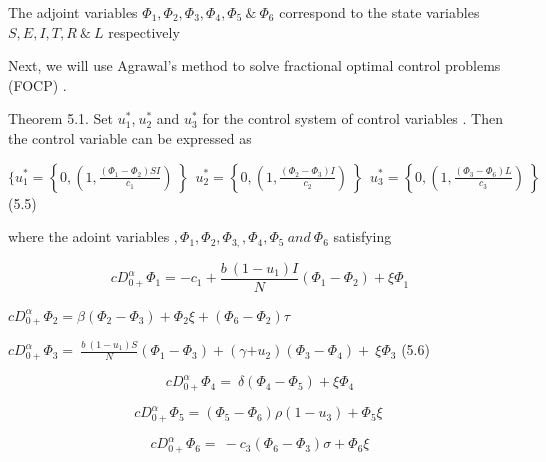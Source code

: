 \documentclass[10pt]{NSP1}
\begin{document}
The adjoint variables $\Phi_{1},\Phi_{2},\Phi_{3},\Phi_{4},\Phi_{5}\ \&\ \Phi_{6}$ correspond to the state variables $S,E,I,T,R\ \&\ L$ respectively

Next, we will use Agrawal’s method to solve fractional optimal control problems (FOCP) \cite{ref38}.

Theorem 5.1. Set $u_{1}^{*}$,$\ u_{2}^{*}$ and $u_{3}^{*}$ for the control system of control variables . Then the control variable can be expressed as

$\{ u_{1}^{*} = \left\{ 0,\left( 1,\frac{\left( \Phi_{1} - \Phi_{2} \right)SI}{c_{1}} \right)\  \right\}\ \ u_{2}^{*} = \left\{ 0,\left( 1,\frac{\left( \Phi_{2} - \Phi_{3} \right)I}{c_{2}} \right)\  \right\}\ \ u_{3}^{*} = \left\{ 0,\left( 1,\frac{\left( \Phi_{3} - \Phi_{6} \right)L}{c_{3}} \right)\  \right\}\ \ $ (5.5)

where the adoint variables $,\Phi_{1},\Phi_{2},\Phi_{3,},\Phi_{4},\Phi_{5}\ and\ \Phi_{6}$ satisfying

\begin{equation}
{cD}_{0 +}^{\alpha}\Phi_{1} = {- c}_{1} + \frac{b\ \left( 1 - u_{1} \right)I}{N}\left( \Phi_{1} - \Phi_{2} \right) + {\xi\Phi}_{1}

\end{equation}

${cD}_{0 +}^{\alpha}\Phi_{2} = \beta\left( \Phi_{2} - \Phi_{3} \right) + \Phi_{2}\xi + (\Phi_{6} - \Phi_{2})\tau$

${cD}_{0 +}^{\alpha}\Phi_{3} = \ \frac{b\ \left( 1 - u_{1} \right)S}{N}\left( \Phi_{1} - \Phi_{3} \right) + (\gamma{+ u}_{2})\left( \Phi_{3} - \Phi_{4} \right) + \ \xi\Phi_{3}$ (5.6)

\begin{equation}
{cD}_{0 +}^{\alpha}\Phi_{4} = \ \delta\left( \Phi_{4} - \Phi_{5} \right) + \xi\Phi_{4}

\end{equation}

\begin{equation}
{cD}_{0 +}^{\alpha}\Phi_{5} = \left( \Phi_{5} - \Phi_{6} \right)\rho\left( 1 - u_{3} \right) + \Phi_{5}\xi\ 

\end{equation}

\begin{equation}
{cD}_{0 +}^{\alpha}\Phi_{6} = \  - c_{3}\left( \Phi_{6} - \Phi_{3} \right)\sigma + \Phi_{6}\xi

\end{equation}
\end{document}
